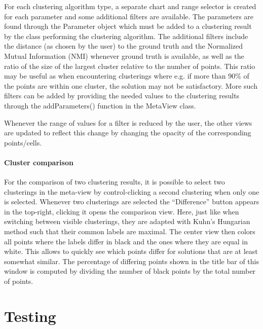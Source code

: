 \documentclass[
	a4paper,
	english,
	twoside,
	openright,               
	11pt                            
	]{report}
\begin{document}
For each clustering algorithm type, a separate chart and range selector is created for each parameter and some additional filters are available. The parameters are found through the Parameter object which must be added to a clustering result by the class performing the clustering algorithm. The additional filters include the distance (as chosen by the user) to the ground truth and the Normalized Mutual Information (NMI) \cite{10.5555/1756006.1953024} whenever ground truth is available, as well as the ratio of the size of the largest cluster relative to the number of points. This ratio may be useful as when encountering clusterings where e.g. if more than $90\%$ of the points are within one cluster, the solution may not be satisfactory. More such filters can be added by providing the needed values to the clustering results through the addParameters() function in the MetaView class.

Whenever the range of values for a filter is reduced by the user, the other views are updated to reflect this change by changing the opacity of the corresponding points/cells.

\subsection{Cluster comparison}

For the comparison of two clustering results, it is possible to select two clusterings in the meta-view by control-clicking a second clustering when only one is selected. Whenever two clusterings are selected the ``Difference'' button appears in the top-right, clicking it opens the comparison view. Here, just like when switching between visible clusterings, they are adapted with Kuhn’s Hungarian method \cite{Kuhn2010} such that their common labels are maximal. The center view then colors all points where the labels differ in black and the ones where they are equal in white. This allows to quickly see which points differ for solutions that are at least somewhat similar. The percentage of differing points shown in the title bar of this window is computed by dividing the number of black points by the total number of points.

\part{Testing}
\end{document}
